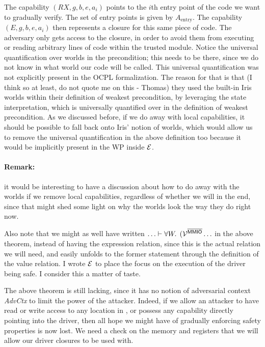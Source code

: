 \documentclass{article}
\newcommand{\X}[1]{\ensuremath{\mathrm{#1}}}
\newcommand{\MMIO}{\textlog{MMIO}}
\begin{document}
The capability $(RX, g, b, e, a_i)$ points to the $i$th entry point of the code
we want to gradually verify.
The set of entry points is given by $A_{\X{entry}}$.
The capability $(E, g, b, e, a_i)$ then represents
a closure for this same piece of code. The adversary only gets access to the
closure, in order to avoid them from executing or reading arbitrary lines of
code within the trusted module.
Notice the universal quantification over worlds in the precondition;
this needs to be there, since we do not know in what world our code will be
called.
This universal quantification was not explicitly present in the OCPL
formalization.
The reason for that is that (I think so at least, do not quote me
on this - Thomas) they
used the built-in Iris worlds within their definition of weakest precondition,
by leveraging the state interpretation, which is universally quantified over in
the definition of weakest precondition.
As we discussed before, if we do away
with local capabilities, it should be possible to fall back onto Iris' notion of
worlds, which would allow us to remove the universal quantification in the
above definition too because it would be implicitly present in the WP inside $\mathcal{E}$.

\paragraph*{Remark:} it would be interesting to have a discussion about how to
do away with the worlds if we remove local capabilities, regardless of whether
we will in the end, since that might shed some light on why the worlds look the
way they do right now.

Also note that we might as well have written
$\ldots \vdash \forall W \ldotp \; (\VR^{\notMMIO} \ldots $ %
in the above theorem, instead of having the expression relation, since this is
the actual relation we will need, and easily unfolds to the former statement
through the definition of the value relation. I wrote $\mathcal{E}$ to place the focus
on the execution of the driver being safe. I consider this a matter of taste.

The above theorem is still lacking, since it has no notion of adversarial
context \textit{AdvCtx} to limit the power of the attacker. Indeed, if we allow
an attacker to have read or write access to any location in \MMIO, or possess
any capability directly pointing into the driver, then all hope we might have of
gradually enforcing safety properties is now lost. We need a check on the memory
and registers that we will allow our driver closures to be used with.
\end{document}
